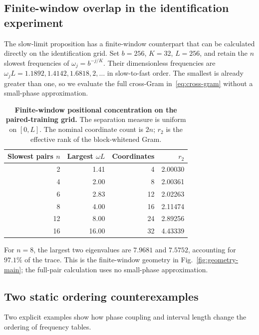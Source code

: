 \subsection{Finite-window overlap in the identification experiment}
\label{sec:finite-window-rank}

The slow-limit proposition has a finite-window counterpart that can be calculated directly on the identification grid. Set $b=256$, $K=32$, $L=256$, and retain the $n$ slowest frequencies of $\omega_j=b^{-j/K}$. Their dimensionless frequencies are $\omega_jL=1.1892,1.4142,1.6818,2,\ldots$ in slow-to-fast order. The smallest is already greater than one, so we evaluate the full cross-Gram in~\eqref{eq:cross-gram} without a small-phase approximation.

\begin{table}[ht]
\centering\small
\caption{\textbf{Finite-window positional concentration on the paired-training grid.} The separation measure is uniform on $[0,L]$. The nominal coordinate count is $2n$; $r_2$ is the effective rank of the block-whitened Gram.}
\label{tab:finite-window-rank}
\begin{tabular}{@{}rrrr@{}}
\toprule
Slowest pairs $n$ & Largest $\omega L$ & Coordinates & $r_2$ \\
\midrule
2 & 1.41 & 4 & 2.00030 \\
4 & 2.00 & 8 & 2.00361 \\
6 & 2.83 & 12 & 2.02263 \\
8 & 4.00 & 16 & 2.11474 \\
12 & 8.00 & 24 & 2.89256 \\
16 & 16.00 & 32 & 4.43339 \\
\bottomrule
\end{tabular}
\end{table}

For $n=8$, the largest two eigenvalues are $7.9681$ and $7.5752$, accounting
for $97.1\%$ of the trace. This is the finite-window geometry in
Fig.~\ref{fig:geometry-main}; the full-pair calculation uses no small-phase approximation.
\subsection{Two static ordering counterexamples}
\label{sec:static-counterexamples}

Two explicit examples show how phase coupling and interval length change
the ordering of frequency tables.

